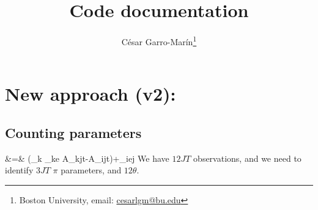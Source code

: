 \documentclass[a4paper, 12pt]{article}
\title{Code documentation}
\author{C\'esar Garro-Mar\'in\thanks{Boston University, email: \href{mailto:cesarlgm@bu.edu}{cesarlgm@bu.edu}}}
\begin{document}
\maketitle

%
%
%
%


\section{New approach (v2):}
\subsection{Counting parameters}
\beqns
\Delta {}&=& \left(\sum_k \theta_{ke} \Delta \ln A_{kjt}-\Delta \ln A_{ijt}\right)+\varepsilon_{iej} \label{eq:skills_eq} 
\eeqns
We have $12JT$ observations, and we need to identify $3JT$ $\pi$ parameters, and $12\theta$. 
\end{document}
